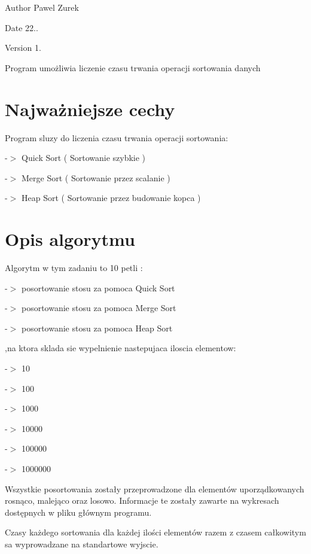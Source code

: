 \begin{DoxyAuthor}{Author}
Pawel Zurek 
\end{DoxyAuthor}
\begin{DoxyDate}{Date}
22.. 
\end{DoxyDate}
\begin{DoxyVersion}{Version}
1.
\end{DoxyVersion}
Program umożliwia liczenie czasu trwania operacji sortowania danych\hypertarget{index_etykieta-wazne-cechy}{}\section{Najważniejsze cechy}\label{index_etykieta-wazne-cechy}
Program sluzy do liczenia czasu trwania operacji sortowania\-:\par


\par
-\/$>$ Quick Sort ( Sortowanie szybkie ) \par
-\/$>$ Merge Sort ( Sortowanie przez scalanie ) \par
-\/$>$ Heap Sort ( Sortowanie przez budowanie kopca )\hypertarget{index_etykieta-op-algorytm}{}\section{Opis algorytmu}\label{index_etykieta-op-algorytm}
Algorytm w tym zadaniu to 10 petli \-: \par
-\/$>$ posortowanie stosu za pomoca Quick Sort \par
-\/$>$ posortowanie stosu za pomoca Merge Sort \par
-\/$>$ posortowanie stosu za pomoca Heap Sort

\par
,na ktora sklada sie wypelnienie nastepujaca iloscia elementow\-:

\par
-\/$>$ 10 \par
-\/$>$ 100 \par
-\/$>$ 1000 \par
-\/$>$ 10000 \par
-\/$>$ 100000 \par
-\/$>$ 1000000

\par
 Wszystkie posortowania zostały przeprowadzone dla elementów uporządkowanych rosnąco, malejąco oraz losowo. Informacje te zostały zawarte na wykresach dostępnych w pliku głównym programu.

Czasy każdego sortowania dla każdej ilości elementów razem z czasem całkowitym sa wyprowadzane na standartowe wyjscie. 